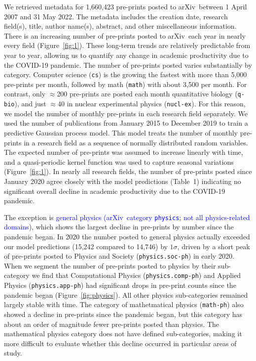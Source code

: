 \documentclass[]{rsos}%
\newcommand{\arxiv}{arXiv}
\newcommand{\add}[1]{\textcolor{blue}{#1}}
\begin{document}
We retrieved metadata for 1,660,423 pre-prints posted to \arxiv\ between 1 April 2007 and 31 May 2022. The metadata includes the creation date, research field(s), title, author name(s), abstract, and other miscellaneous information\cite{Clement:2019}. There is an increasing number of pre-prints posted to \arxiv\ each year in nearly every field (Figure~\ref{fig:1}). These long-term trends are relatively predictable from year to year, allowing us to quantify any change in academic productivity due to the COVID-19 pandemic. The number of pre-prints posted varies substantially by category. Computer science (\texttt{cs}) is the growing the fastest with more than 5,000 pre-prints per month, followed by math (\texttt{math}) with about 3,500 per month. For contrast, only $\approx$200 pre-prints are posted each month quantitative biology (\texttt{q-bio}), and just $\approx$40 in nuclear experimental physics (\texttt{nucl-ex}). For this reason, we model the number of monthly pre-prints in each research field separately. We used the number of publications from January 2015 to December 2019 to train a predictive Gaussian process model\cite{Rasmussen:2006}. This model treats the number of monthly pre-prints in a research field as a sequence of normally distributed random variables. The expected number of pre-prints was assumed to increase linearly with time, and a quasi-periodic kernel function\cite{Rasmussen:2006,Ambikasaran:2014} was used to capture seasonal variations (Figure~\ref{fig:1}). In nearly all research fields, the number of pre-prints posted since January 2020 agree closely with the model predictions (Table~1) indicating no significant overall decline in academic productivity due to the COVID-19 pandemic. %

The exception is \add{general physics (\arxiv\ category \texttt{physics}; not all physics-related domains}), which shows the largest decline in pre-prints by number since the pandemic began. In 2020 the number posted to general physics actually exceeded our model predictions (15,242 compared to 14,746) by $1\sigma$, driven by a short peak of pre-prints posted to Physics and Society (\texttt{physics.soc-ph}) in early 2020. When we segment the number of pre-prints posted to physics by their sub-category we find that Computational Physics (\texttt{physics.comp-ph}) and Applied Physics (\texttt{physics.app-ph}) had significant drops in pre-print counts since the pandemic began (Figure~\ref{fig:physics}). All other physics sub-categories remained largely stable with time. The category of mathetmatical physics (\texttt{math-ph}) also showed a decline in pre-prints since the pandemic began, but this category has about an order of magnitude fewer pre-prints posted than physics. The mathematical physics category does not have defined sub-categories, making it more difficult to evaluate whether this decline occurred in particular areas of study.
\end{document}
